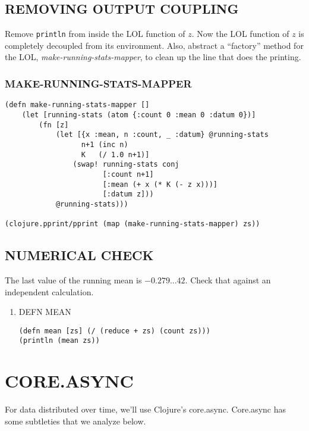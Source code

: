 \documentclass[10pt,oneside,x11names]{article}
\begin{document}
\subsection{REMOVING OUTPUT COUPLING}
\label{REMOVING-OUTPUT-COUPLING}
Remove \texttt{println} from inside the LOL function of \(z\). Now the LOL
function of \(z\) is completely decoupled from its environment. Also,
abstract a ``factory'' method for the LOL, \emph{make-running-stats-mapper}, to
clean up the line that does the printing.

\subsubsection{MAKE-RUNNING-STATS-MAPPER}
\label{make-running-stats-mapper}
\begin{verbatim}
(defn make-running-stats-mapper []
    (let [running-stats (atom {:count 0 :mean 0 :datum 0})]
        (fn [z]
            (let [{x :mean, n :count, _ :datum} @running-stats
                  n+1 (inc n)
                  K   (/ 1.0 n+1)]
                (swap! running-stats conj
                       [:count n+1]
                       [:mean (+ x (* K (- z x)))]
                       [:datum z]))
            @running-stats)))

(clojure.pprint/pprint (map (make-running-stats-mapper) zs))
\end{verbatim}

\subsection{NUMERICAL CHECK}
\label{numerical-check}
The last value of the running mean is \(-0.279...42\). Check that against
an independent calculation.

\begin{enumerate}
\item DEFN MEAN
\label{sec:org908c085}

\begin{verbatim}
(defn mean [zs] (/ (reduce + zs) (count zs)))
(println (mean zs))
\end{verbatim}
\end{enumerate}

\section{CORE.ASYNC}
\label{core.async}
For data distributed over time, we'll use Clojure's core.async.
Core.async has some subtleties that we analyze below.
\end{document}
